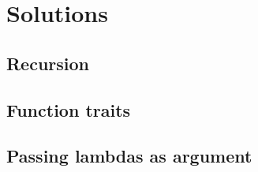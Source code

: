 \section{Solutions}

\subsection{Recursion}

\newpage

\subsection{Function traits}

\newpage

\subsection{Passing lambdas as argument}

